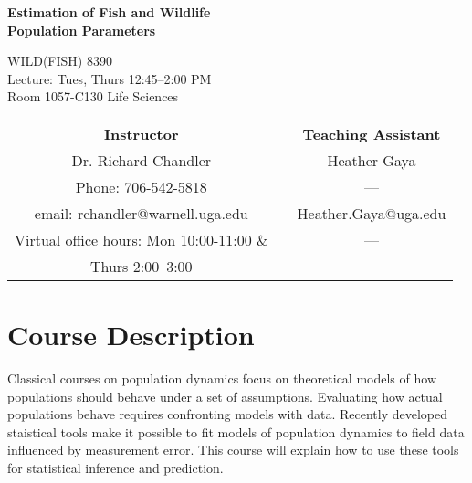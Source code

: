 \documentclass[12pt]{article}
\begin{document}

{\centering

{\Large \bf \sc
  Estimation of Fish and Wildlife \\ Population Parameters \\
}
\vspace{12pt}

WILD(FISH) 8390  \\
Lecture: Tues, Thurs 12:45--2:00 PM \\
Room 1057-C130 Life Sciences \\


\normalsize

\vspace{24pt}

\begin{tabular}[h!]{ccc}
\textbf{Instructor}                 & \hspace{0.01cm} & \textbf{Teaching Assistant} \\
Dr. Richard Chandler                & & Heather Gaya\\
Phone: 706-542-5818                 & & --- \\
email: rchandler@warnell.uga.edu    & & Heather.Gaya@uga.edu \\
Virtual office hours: Mon 10:00-11:00 \&  & & --- \\
   Thurs 2:00--3:00 & & \\
\end{tabular}


}



\normalsize


\vspace{-2mm}
\section*{\normalsize Course Description}
\vspace{-4mm}
Classical courses on population dynamics focus on theoretical models 
of how populations should behave under a set of assumptions.
Evaluating how actual populations behave requires confronting models
with data. Recently developed staistical tools make it possible to fit
models of population dynamics to field data influenced by measurement
error. This course will explain how to use these tools for statistical
inference and prediction.  
\end{document}
